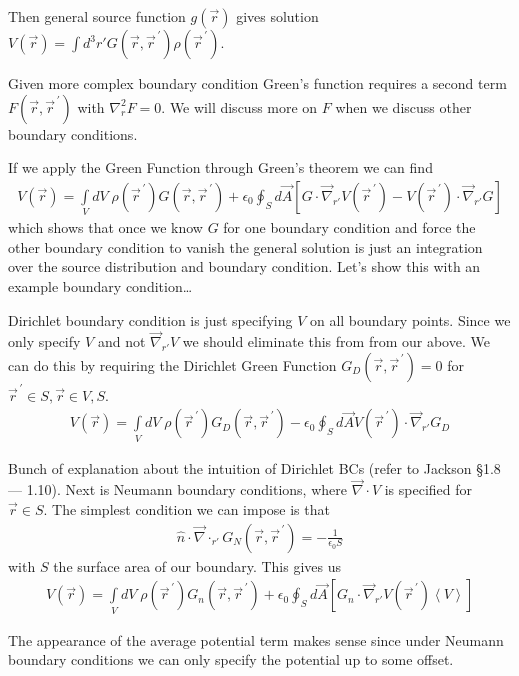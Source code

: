 \documentclass[10pt]{report}
\newcommand{\pvec}[1]{\vec{#1}^{\,\prime}}
\newcommand{\grad}[0]{\vec{\nabla}}
\renewcommand{\div}[0]{\vec{\nabla}\cdot}
\newcommand{\expvalue}[1]{\left<#1\right>}
\begin{document}
Then general source function $g(\vec{r})$ gives solution $V(\vec{r}) = \int d^3r' G(\vec{r}, \pvec{r}) \rho(\pvec{r})$.

Given more complex boundary condition Green's function requires a second term $F(\vec{r}, \pvec{r})$ with $\nabla^2_r F = 0$. We will discuss more on $F$ when we discuss other boundary conditions. 

If we apply the Green Function through Green's theorem we can find
\begin{align}
    V(\vec{r}) = \displaystyle\int\limits_{V}^{}dV\;\rho(\pvec{r})G(\vec{r}, \pvec{r}) + \epsilon_0\oint_S d\vec{A}\left[ G\cdot \grad_{r'}V(\pvec{r}) - V(\pvec{r})\cdot \grad_{r'} G \right]
\end{align}
which shows that once we know $G$ for one boundary condition and force the other boundary condition to vanish the general solution is just an integration over the source distribution and boundary condition. Let's show this with an example boundary condition\dots

Dirichlet boundary condition is just specifying $V$ on all boundary points. Since we only specify $V$ and not $\vec{\nabla}_{r'} V$ we should eliminate this from from our above. We can do this by requiring the Dirichlet Green Function $G_D(\vec{r}, \pvec{r}) = 0$ for $\pvec{r}\in S, \vec{r}\in V,S$. 
\begin{align}
    V(\vec{r}) = \displaystyle\int\limits_{V}^{}dV\;\rho(\pvec{r})G_D(\vec{r}, \pvec{r}) - \epsilon_0\oint_S d\vec{A}V(\pvec{r})\cdot \grad_{r'} G_D\label{Green.D}
\end{align}

Bunch of explanation about the intuition of Dirichlet BCs (refer to Jackson \S 1.8 --- 1.10). Next is Neumann boundary conditions, where $\div V$ is specified for $\vec{r}\in S$. The simplest condition we can impose is that
\begin{align}
    \hat{n} \cdot \div_{r'}G_N(\vec{r}, \pvec{r}) = -\frac{1}{\epsilon_0S}
\end{align}
with $S$ the surface area of our boundary. This gives us
\begin{align}
    V(\vec{r}) = \displaystyle\int\limits_{V}^{}dV\;\rho(\pvec{r})G_n(\vec{r}, \pvec{r}) + \epsilon_0\oint_S d\vec{A}\left[ G_n\cdot \grad_{r'}V(\pvec{r}) \expvalue{V} \right]
\end{align}

The appearance of the average potential term makes sense since under Neumann boundary conditions we can only specify the potential up to some offset.
\end{document}
